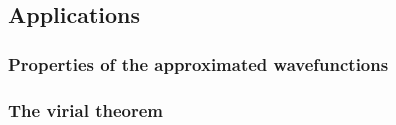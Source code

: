 \subsection{Applications}

\subsubsection{Properties of the approximated wavefunctions} \label{sec:prop_of_app}

\subsubsection{The virial theorem }